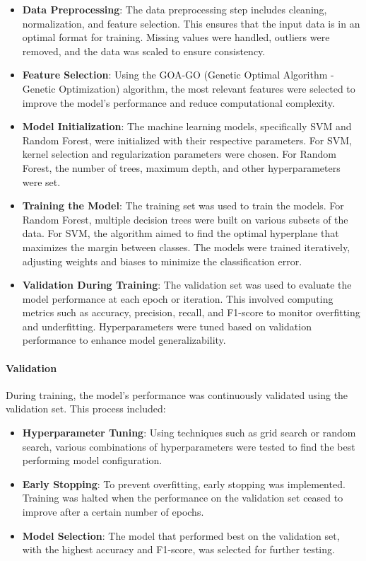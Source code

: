 \begin{itemize}
    \item \textbf{Data Preprocessing}: The data preprocessing step includes cleaning, normalization, and feature selection. This ensures that the input data is in an optimal format for training. Missing values were handled, outliers were removed, and the data was scaled to ensure consistency.
    \item \textbf{Feature Selection}: Using the GOA-GO (Genetic Optimal Algorithm - Genetic Optimization) algorithm, the most relevant features were selected to improve the model's performance and reduce computational complexity.
    \item \textbf{Model Initialization}: The machine learning models, specifically SVM and Random Forest, were initialized with their respective parameters. For SVM, kernel selection and regularization parameters were chosen. For Random Forest, the number of trees, maximum depth, and other hyperparameters were set.
    \item \textbf{Training the Model}: The training set was used to train the models. For Random Forest, multiple decision trees were built on various subsets of the data. For SVM, the algorithm aimed to find the optimal hyperplane that maximizes the margin between classes. The models were trained iteratively, adjusting weights and biases to minimize the classification error.
    \item \textbf{Validation During Training}: The validation set was used to evaluate the model performance at each epoch or iteration. This involved computing metrics such as accuracy, precision, recall, and F1-score to monitor overfitting and underfitting. Hyperparameters were tuned based on validation performance to enhance model generalizability.
\end{itemize}

\paragraph{Validation}

During training, the model's performance was continuously validated using the validation set. This process included:

\begin{itemize}
    \item \textbf{Hyperparameter Tuning}: Using techniques such as grid search or random search, various combinations of hyperparameters were tested to find the best performing model configuration.
    \item \textbf{Early Stopping}: To prevent overfitting, early stopping was implemented. Training was halted when the performance on the validation set ceased to improve after a certain number of epochs.
    \item \textbf{Model Selection}: The model that performed best on the validation set, with the highest accuracy and F1-score, was selected for further testing.
\end{itemize}


